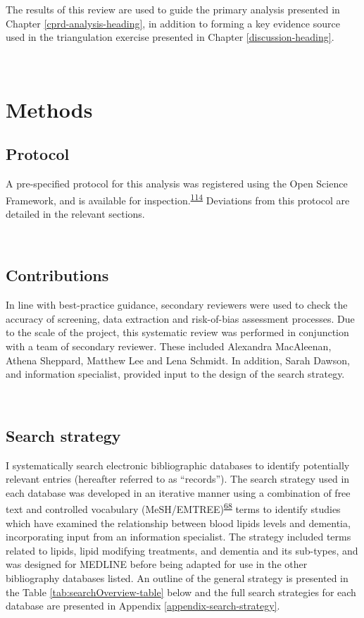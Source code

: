\documentclass[a4paper, twoside]{templates/ociamthesis}
\begin{document}
The results of this review are used to guide the primary analysis presented in Chapter \ref{cprd-analysis-heading}, in addition to forming a key evidence source used in the triangulation exercise presented in Chapter \ref{discussion-heading}.

~

\hypertarget{methods}{%
\section{Methods}\label{methods}}

\hypertarget{protocol}{%
\subsection{Protocol}\label{protocol}}

A pre-specified protocol for this analysis was registered using the Open Science Framework, and is available for inspection.\textsuperscript{\protect\hyperlink{ref-mcguinnessluke2020}{114}} Deviations from this protocol are detailed in the relevant sections.

~

\hypertarget{contributions}{%
\subsection{Contributions}\label{contributions}}

In line with best-practice guidance, secondary reviewers were used to check the accuracy of screening, data extraction and risk-of-bias assessment processes. Due to the scale of the project, this systematic review was performed in conjunction with a team of secondary reviewer. These included Alexandra MacAleenan, Athena Sheppard, Matthew Lee and Lena Schmidt. In addition, Sarah Dawson, and information specialist, provided input to the design of the search strategy.

~

\hypertarget{search-strategy}{%
\subsection{Search strategy}\label{search-strategy}}

I systematically search electronic bibliographic databases to identify potentially relevant entries (hereafter referred to as ``records''). The search strategy used in each database was developed in an iterative manner using a combination of free text and controlled vocabulary (MeSH/EMTREE)\textsuperscript{\protect\hyperlink{ref-lefebvre2019searching}{68}} terms to identify studies which have examined the relationship between blood lipids levels and dementia, incorporating input from an information specialist. The strategy included terms related to lipids, lipid modifying treatments, and dementia and its sub-types, and was designed for MEDLINE before being adapted for use in the other bibliography databases listed. An outline of the general strategy is presented in the Table \ref{tab:searchOverview-table} below and the full search strategies for each database are presented in Appendix \ref{appendix-search-strategy}.
\end{document}
